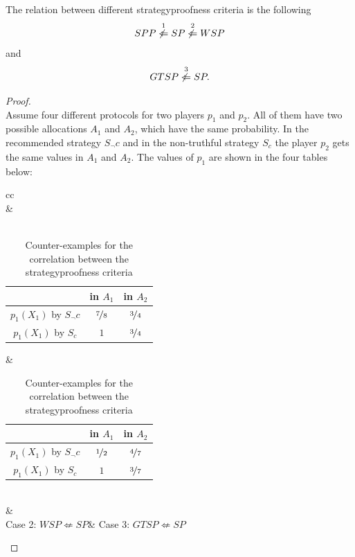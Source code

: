 \begin{lem} The relation between different strategyproofness criteria is the following $$SPP \overset{\text{1}}{\not\Leftarrow} SP \overset{\text{2}}{\not\Leftarrow} WSP$$ and
$$GTSP \overset{\text{3}}{\not\Leftarrow} SP.$$
\end{lem}
\begin{proof}
\textcolor{white}{x}\\
\newline
Assume four different protocols for two players $p_1$ and $p_2$. All of them have two possible allocations $A_1$ and $A_2$, which have the same probability. In the recommended strategy $S_\neg c$ and in the non-truthful strategy $S_c$ the player $p_2$ gets the same values in $A_1$ and $A_2$. The values of $p_1$ are shown in the four tables below:\\
\begin{table}[htb]
		\centering
		\renewcommand{\arraystretch}{1.2}
		\begin{tabular}{cc}
			 \\	
 		&\\ 
\\
\begin{tabular}{c|cc}
		& in $A_1$& in $A_2$\\
		\hline
		$p_1(X_1)$ by $S_\neg c$ & {$\nicefrac{7}{8}$} & $\nicefrac{3}{4}$\\ 
  $p_1(X_1)$ by $S_c$& $1$ & {$\nicefrac{3}{4}$}\\ 
 		\end{tabular}&\begin{tabular}{c|cc}
		& in $A_1$& in $A_2$\\
		\hline
		$p_1(X_1)$ by $S_\neg c$ & {$\nicefrac{1}{2}$} & $\nicefrac{4}{7}$\\ 
  $p_1(X_1)$ by $S_c$& $1$ & {$\nicefrac{3}{7}$}\\ 
 		\end{tabular}\\	 
 		&\\
Case 2: $WSP \not\Leftarrow SP$& Case 3: $GTSP \not\Leftarrow SP$
\end{tabular}
\caption{Counter-examples for the correlation between the strategyproofness criteria}\label{234}
\end{table}


\end{proof}
